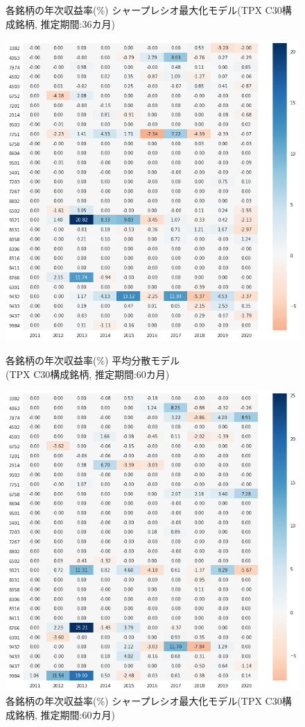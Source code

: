 \documentclass[dvipdfmx,autodetect-engine]{jsarticle}
\begin{document}
\begin{figure}[htbp]
\begin{minipage}{0.5\hsize}
\begin{center}
\end{center}
\caption{\small 各銘柄の年次収益率(\%) シャープレシオ最大化モデル(TPX C30構成銘柄, 推定期間:36カ月)}
\label{fig:22}
\end{minipage}
\begin{minipage}{0.5\hsize}
\begin{center}
\includegraphics[width=0.8\hsize]{./figures/mmvp_tpx30_w=60_hm.png}
\end{center}
\caption{\small 各銘柄の年次収益率(\%) 平均分散モデル\\(TPX C30構成銘柄, 推定期間:60カ月)}
\label{fig:31}
\end{minipage}
\begin{minipage}{0.5\hsize}
\begin{center}
\includegraphics[width=0.8\hsize]{./figures/srmp_tpx30_w=60_hm.png}
\end{center}
\caption{\small 各銘柄の年次収益率(\%) シャープレシオ最大化モデル(TPX C30構成銘柄, 推定期間:60カ月)}
\label{fig:32}
\end{minipage}
\end{figure}
\end{document}
